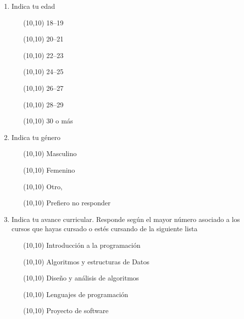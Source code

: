 \begin{enumerate}

\item{Indica tu edad}
    \begin{itemize}
        \item[\framebox(10,10){ }]{18--19}
        \item[\framebox(10,10){ }]{20--21}
        \item[\framebox(10,10){ }]{22--23}
        \item[\framebox(10,10){ }]{24--25}
        \item[\framebox(10,10){ }]{26--27}
        \item[\framebox(10,10){ }]{28--29}
        \item[\framebox(10,10){ }]{30 o más}
    \end{itemize}

\item{Indica tu género}
    \begin{itemize}
        \item[\framebox(10,10){ }]{Masculino}
        \item[\framebox(10,10){ }]{Femenino}
        \item[\framebox(10,10){ }]{Otro, }
        \item[\framebox(10,10){ }]{Prefiero no responder}
    \end{itemize}

\item{Indica tu avance curricular. Responde según el mayor número asociado a los cursos que hayas cursado o estés cursando de la siguiente lista}
    \begin{itemize}
        \item[\framebox(10,10){ }] Introducción a la programación
        \item[\framebox(10,10){ }] Algoritmos y estructuras de Datos
        \item[\framebox(10,10){ }] Diseño y análisis de algoritmos
        \item[\framebox(10,10){ }] Lenguajes de programación
        \item[\framebox(10,10){ }] Proyecto de software
    \end{itemize}
\end{enumerate}
